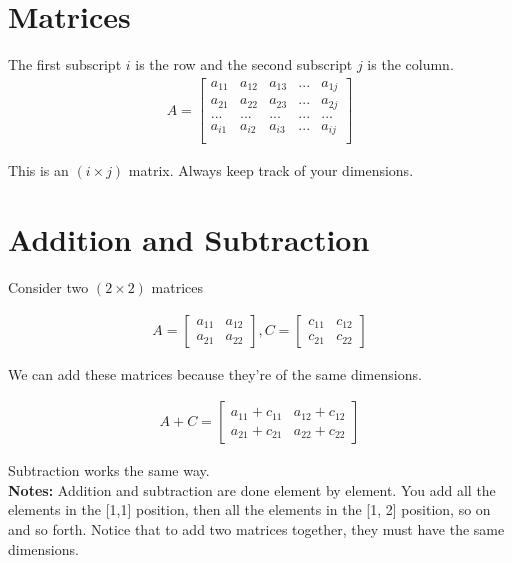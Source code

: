 \documentclass{article}
\begin{document}
\section{Matrices}
The first subscript $i$ is the row and the second subscript $j$ is the column.
\begin{align}
    A = \begin{bmatrix}
        a_{11} & a_{12} & a_{13} & ... & a_{1j}\\
        a_{21} & a_{22} & a_{23} & ... & a_{2j}\\
        ... & ... & ... & ... & ... \\
        a_{i1} & a_{i2} & a_{i3} & ... & a_{ij}\\
    \end{bmatrix}
\end{align}

This is an $(i \times j)$ matrix. Always keep track of your dimensions. 

\section{Addition and Subtraction} 
Consider two $(2 \times 2)$ matrices 

\begin{align}
    A = \begin{bmatrix}
            a_{11} & a_{12} \\
            a_{21} & a_{22}
        \end{bmatrix}, 
    C = \begin{bmatrix}
            c_{11} & c_{12} \\
            c_{21} & c_{22}
        \end{bmatrix}
\end{align}

We can add these matrices because they're of the same dimensions. 

\begin{align}
    A + C = \begin{bmatrix}
                a_{11} + c_{11} & a_{12} + c_{12} \\
                a_{21} + c_{21} & a_{22} + c_{22}
            \end{bmatrix}
\end{align}

Subtraction works the same way.\\

\textbf{Notes:} Addition and subtraction are done element by element. You add all the elements in the [1,1] position, then all the elements in the [1, 2] position, so on and so forth. Notice that to add two matrices together, they must have the same dimensions. 
\end{document}
